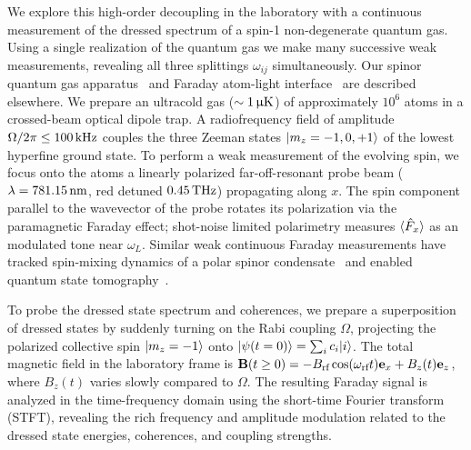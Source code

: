 \documentclass[aps,prl,reprint,superscriptaddress,floatfix]{revtex4-1}
\begin{document}
We explore this high-order decoupling in the laboratory with a continuous measurement of the dressed spectrum of a spin-1 non-degenerate quantum gas.
Using a single realization of the quantum gas we make many successive weak measurements, revealing all three splittings $\omega_{ij}$ simultaneously.
Our spinor quantum gas apparatus~\cite{wood_magnetic_2015} and Faraday atom-light interface~\cite{jasperse_magic-wavelength_2017} are described elsewhere.
We prepare an ultracold gas ($\sim \unit[1]{\upmu K}$) of approximately $10^6$ \Rb atoms in a crossed-beam optical dipole trap.
A radiofrequency field of amplitude $\Omega/2\pi \leq \unit[100]{kHz}$ couples the three Zeeman states $\vert m_z=-1,0,+1 \rangle $ of the lowest hyperfine ground state.
To perform a weak measurement of the evolving spin, we focus onto the atoms a linearly polarized far-off-resonant probe beam ($\lambda=\unit[781.15]{nm}$, red detuned $\unit[0.45]{THz}$) propagating along $x$.
The spin component parallel to the wavevector of the probe rotates its polarization via the paramagnetic Faraday effect; shot-noise limited polarimetry measures $\langle \hat{F}_x \rangle$ as an modulated tone near $\omega_L$.
Similar weak continuous Faraday measurements have tracked spin-mixing dynamics of a polar spinor condensate~\cite{liu_quantum_2009} and enabled quantum state tomography~\cite{smith_continuous_2004,smith_efficient_2006}.

To probe the dressed state spectrum and coherences, we prepare a superposition of dressed states by suddenly turning on the Rabi coupling $\Omega$, projecting the polarized collective spin $\vert m_z=-1 \rangle $ onto $\vert \psi(t=0) \rangle  = \sum_i c_i \vert i \rangle $.
The total magnetic field in the laboratory frame is $\mathbf{B}(t \geq 0) = -B_{\text{rf}} \cos (\omega_{\text{rf}} t) \mathbf{e}_x + B_z(t) \mathbf{e}_z$, where $B_z(t)$ varies slowly compared to $\Omega$.
The resulting Faraday signal is analyzed in the time-frequency domain using the short-time Fourier transform (STFT), revealing the rich frequency and amplitude modulation related to the dressed state energies, coherences, and coupling strengths.
\end{document}
